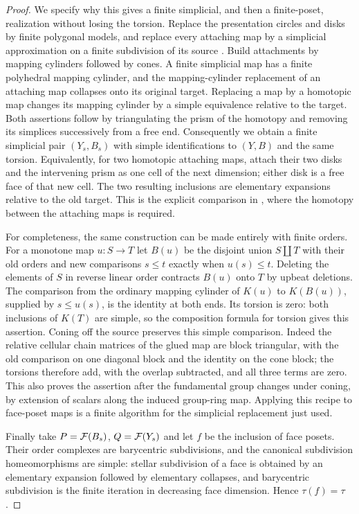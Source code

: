 \begin{proof}
We specify why this gives a finite simplicial, and then a finite-poset,
realization without losing the torsion. Replace the presentation
circles and disks by finite polygonal models, and replace every
attaching map by a simplicial approximation on a finite subdivision of
its source \cite[Theorem~2C.1]{I_Hatcher2002}.
Build attachments by mapping cylinders followed by cones.
A finite simplicial map has a finite polyhedral mapping cylinder, and
the mapping-cylinder replacement of an attaching map collapses onto
its original target. Replacing a map by a homotopic map changes its
mapping cylinder by a simple equivalence relative to the target. Both
assertions follow by triangulating the prism of the homotopy and
removing its simplices successively from a free end. Consequently we
obtain a finite simplicial pair $(Y_s,B_s)$ with simple identifications
to $(Y,B)$ and the same torsion.
Equivalently, for two homotopic attaching maps, attach their two
disks and the intervening prism as one cell of the next dimension;
either disk is a free face of that new cell. The two resulting
inclusions are elementary expansions relative to the old target.
This is the explicit comparison in
\cite[Example~11]{I_LurieWhiteheadII}, where the homotopy between
the attaching maps is required.

For completeness, the same construction can be made entirely with
finite orders. For a monotone map $u:S\to T$ let $B(u)$ be the disjoint
union $S\amalg T$ with their old orders and new comparisons
$s\leq t$ exactly when $u(s)\leq t$. Deleting the elements of $S$
in reverse linear order contracts $B(u)$ onto $T$ by upbeat deletions.
The comparison from the ordinary mapping cylinder of $K(u)$ to
$K(B(u))$, supplied by $s\leq u(s)$, is the identity at both ends.
Its torsion is zero: both inclusions of $K(T)$ are simple, so the
composition formula for torsion gives this assertion. Coning off the
source preserves this simple comparison. Indeed the relative cellular
chain matrices of the glued map are block triangular, with the old
comparison on one diagonal block and the identity on the cone block;
the torsions therefore add, with the overlap subtracted, and all three
terms are zero. This also proves the assertion after the fundamental
group changes under coning, by extension of scalars along the induced
group-ring map. Applying this recipe to face-poset maps is a finite
algorithm for the simplicial replacement just used.

Finally take $P=\mathcal F(B_s)$, $Q=\mathcal F(Y_s)$ and let $f$ be the inclusion
of face posets. Their order complexes are barycentric subdivisions,
and the canonical subdivision homeomorphisms are simple: stellar
subdivision of a face is obtained by an elementary expansion followed
by elementary collapses, and barycentric subdivision is the finite
iteration in decreasing face dimension. Hence $\tau(f)=\tau$.


\end{proof}
